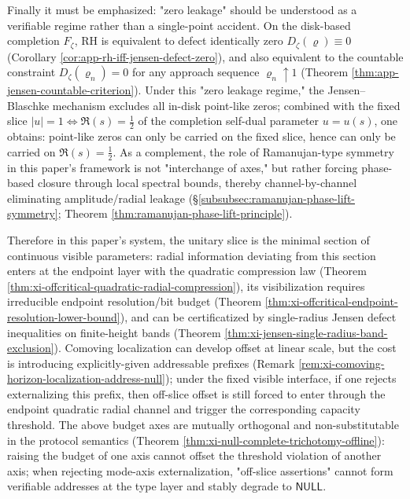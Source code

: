 Finally it must be emphasized: "zero leakage" should be understood as a verifiable regime rather than a single-point accident.
On the disk-based completion \(F_\zeta\), RH is equivalent to defect identically zero \(D_{\zeta}(\varrho)\equiv 0\) (Corollary \ref{cor:app-rh-iff-jensen-defect-zero}), and also equivalent to the countable constraint \(D_{\zeta}(\varrho_n)=0\) for any approach sequence \(\varrho_n\uparrow 1\) (Theorem \ref{thm:app-jensen-countable-criterion}).
Under this "zero leakage regime," the Jensen--Blaschke mechanism excludes all in-disk point-like zeros; combined with the fixed slice \(|u|=1\iff \Re(s)=\tfrac12\) of the completion self-dual parameter \(u=u(s)\), one obtains: point-like zeros can only be carried on the fixed slice, hence can only be carried on \(\Re(s)=\tfrac12\).
As a complement, the role of Ramanujan-type symmetry in this paper's framework is not "interchange of axes," but rather forcing phase-based closure through local spectral bounds, thereby channel-by-channel eliminating amplitude/radial leakage (\S\ref{subsubsec:ramanujan-phase-lift-symmetry}; Theorem \ref{thm:ramanujan-phase-lift-principle}).
\par
Therefore in this paper's system, the unitary slice is the minimal section of continuous visible parameters: radial information deviating from this section enters at the endpoint layer with the quadratic compression law (Theorem \ref{thm:xi-offcritical-quadratic-radial-compression}), its visibilization requires irreducible endpoint resolution/bit budget (Theorem \ref{thm:xi-offcritical-endpoint-resolution-lower-bound}), and can be certificatized by single-radius Jensen defect inequalities on finite-height bands (Theorem \ref{thm:xi-jensen-single-radius-band-exclusion}).
Comoving localization can develop offset at linear scale, but the cost is introducing explicitly-given addressable prefixes (Remark \ref{rem:xi-comoving-horizon-localization-address-null}); under the fixed visible interface, if one rejects externalizing this prefix, then off-slice offset is still forced to enter through the endpoint quadratic radial channel and trigger the corresponding capacity threshold.
The above budget axes are mutually orthogonal and non-substitutable in the protocol semantics (Theorem \ref{thm:xi-null-complete-trichotomy-offline}): raising the budget of one axis cannot offset the threshold violation of another axis; when rejecting mode-axis externalization, "off-slice assertions" cannot form verifiable addresses at the type layer and stably degrade to \(\mathsf{NULL}\).

\endinput
